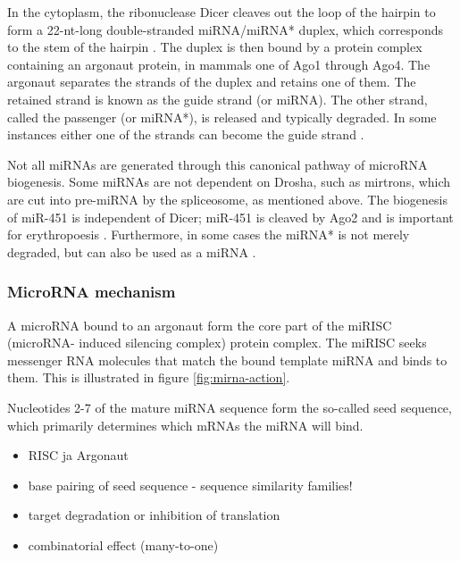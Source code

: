 In the cytoplasm, the ribonuclease Dicer cleaves out the loop of the hairpin
to form a 22-nt-long double-stranded miRNA/miRNA* duplex, which corresponds to
the stem of the hairpin \citep{Bernstein2001,Park2011}.
The duplex is then bound by a protein complex containing an
argonaut protein, in mammals one of Ago1 through Ago4. The argonaut separates the strands
of the duplex and retains one of them. The retained strand is known as the
guide strand (or miRNA). The other strand, called the passenger (or miRNA*), is
released and typically degraded. In some instances either one of the strands can become
the guide strand \citep{Ruby2006}.

Not all miRNAs are generated through this canonical pathway of microRNA
biogenesis. Some miRNAs are not dependent on Drosha, such as mirtrons, which
are cut into pre-miRNA by the spliceosome, as mentioned above. The biogenesis of
miR-451 is independent of Dicer; miR-451 is cleaved by Ago2 and is
important for erythropoesis \citep{Cheloufi2010}. Furthermore, in some cases
the miRNA* is not merely degraded, but can also be used as a miRNA
\citep{Czech2009}.





\subsubsection{MicroRNA mechanism}\label{microrna-mechanism}

A microRNA bound to an argonaut form the core part of the miRISC (microRNA-
induced silencing complex) protein complex. The miRISC seeks messenger RNA
molecules that match the bound template miRNA and binds to them. This is illustrated
in figure \ref{fig:mirna-action}.

Nucleotides 2-7 of the mature miRNA sequence form the so-called seed sequence, which primarily
determines which mRNAs the miRNA will bind.

\begin{itemize}
\item
  RISC ja Argonaut
\item
  base pairing of seed sequence - sequence similarity families!
\item
  target degradation or inhibition of translation
\item
  combinatorial effect (many-to-one)
\end{itemize}





